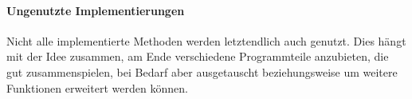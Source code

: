 		\paragraph{Ungenutzte Implementierungen}
		Nicht alle implementierte Methoden werden letztendlich auch genutzt. Dies hängt mit der Idee zusammen, am Ende verschiedene Programmteile anzubieten, die gut zusammenspielen, bei Bedarf aber ausgetauscht beziehungsweise um weitere Funktionen erweitert werden können.